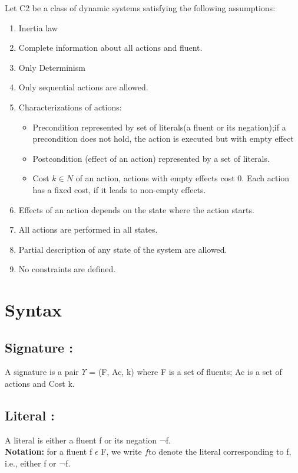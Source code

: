 \documentclass[11pt]{article}
\begin{document}
	Let C2 be a class of dynamic systems satisfying the following assumptions:
	\begin{enumerate}
		\item Inertia law
		\item Complete information about all actions and fluent. 
		\item Only Determinism
		\item Only sequential actions are allowed.
		\item Characterizations of actions:\begin{itemize}
			\item Precondition represented by set of literals(a fluent or its negation);if a precondition does not hold, the action is executed but with empty effect
			\item Postcondition (effect of an action) represented by a set of literals.
			\item Cost $k \in N $ of an action, actions with empty effects cost 0. Each action has a fixed cost, if it leads to non-empty effects. 
		\end{itemize}
		\item Effects of an action depends on the state where the action starts.
		\item All actions are performed in all states.
		\item Partial description of any state of the system are allowed.
		\item No constraints are defined.	 
	\end{enumerate}
	
	\section{Syntax}\label{sec:syntax}
	
	
	\subsection{Signature :}\label{sec:Signature} 

A signature is a pair $\Upsilon$ = (F, Ac, k) where F is a set of fluents; Ac is a set of actions and Cost k.

\subsection{Literal :}\label{sec:Literal} 

A literal is either a fluent f or its negation ¬f.\\
\textbf{Notation:} for a fluent f $\epsilon$ F, we write $\overline{f}$to denote the literal corresponding to f, i.e., either f or ¬f.
\end{document}
